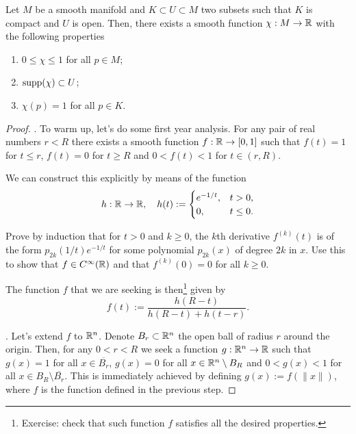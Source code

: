 \begin{lemma}
  Let $M$ be a smooth manifold and $K\subset U\subset M$ two subsets such that $K$ is compact and $U$ is open.
  Then, there exists a smooth function $\chi: M \to\mathbb{R}$ with the following properties
  \begin{enumerate}
    \item $0 \leq \chi \leq 1$ for all $p\in M$;
    \item $\operatorname{supp}(\chi)\subset U$;
    \item $\chi(p) = 1$ for all $p\in K$.
  \end{enumerate}
\end{lemma}
\begin{proof}
  .
  To warm up, let's do some first year analysis.
  For any pair of real numbers $r < R$ there exists a smooth function $f: \mathbb{R} \to [0,1]$ such that $f(t) = 1$ for $t \leq r$, $f(t) = 0$ for $t \geq R$ and $0<f(t)<1$ for $t\in(r,R)$.
  
  We can construct this explicitly by means of the function
  \begin{equation}
    h:\mathbb{R}\to\mathbb{R}, \quad h(t):= \begin{cases}
      e^{-1/t}, & t>0,\\
      0, & t \leq 0.
    \end{cases}
  \end{equation}

  \begin{exercise}
    Prove by induction that for $t>0$ and $k\geq 0$, the $k$th derivative $f^{(k)}(t)$ is of the form $p_{2k}(1/t)e^{-1/t}$ for some polynomial $p_{2k}(x)$ of degree $2k$ in $x$.
    Use this to show that $f\in C^\infty(\mathbb{R})$ and that $f^{(k)}(0) = 0$ for all $k\geq 0$.
  \end{exercise}

  The function $f$ that we are seeking is then\footnote{Exercise: check that such function $f$ satisfies all the desired properties.} given by
  \begin{equation}
    f(t) := \frac{h(R-t)}{h(R-t) + h(t-r)}.
  \end{equation}

  .
  Let's extend $f$ to $\mathbb{R}^n$.
  Denote $B_r \subset \mathbb{R}^n$ the open ball of radius $r$ around the origin.
  Then, for any $0 < r < R$ we seek a function $g:\mathbb{R}^n\to\mathbb{R}$ such that $g(x) = 1$ for all $x\in \overline{B_r}$, $g(x) = 0$ for all $x\in \mathbb{R}^n\setminus B_R$ and $0< g(x)< 1$ for all $x\in B_R\setminus\overline{B_r}$.
  This is immediately achieved by defining $g(x) := f(\|x\|)$, where $f$ is the function defined in the previous step.


\end{proof}

